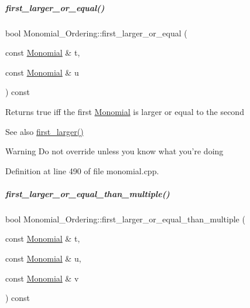 \mbox{\label{group__orderinggroup_afbae8e00a02ce0334bb0376cf0f0db75}} 
\subparagraph{\texorpdfstring{first\+\_\+larger\+\_\+or\+\_\+equal()}{first\_larger\_or\_equal()}}
{\footnotesize\ttfamily bool Monomial\+\_\+\+Ordering\+::first\+\_\+larger\+\_\+or\+\_\+equal (\begin{DoxyParamCaption}\item[{const \hyperlink{group__polygroup_class_monomial}{Monomial} \&}]{t,  }\item[{const \hyperlink{group__polygroup_class_monomial}{Monomial} \&}]{u }\end{DoxyParamCaption}) const}

\begin{DoxyReturn}{Returns}
{\ttfamily true} iff the first \hyperlink{group__polygroup_class_monomial}{Monomial} is larger or equal to the second 
\end{DoxyReturn}
\begin{DoxySeeAlso}{See also}
\hyperlink{group__orderinggroup_aed41fe82e1ca5cd287a93d287fee7c20}{first\+\_\+larger()} 
\end{DoxySeeAlso}
\begin{DoxyWarning}{Warning}
Do not override unless you know what you're doing 
\end{DoxyWarning}


Definition at line 490 of file monomial.\+cpp.

\mbox{\label{group__orderinggroup_ad4af4c79cf46666222fe30fdd4ceb45e}} 
\subparagraph{\texorpdfstring{first\+\_\+larger\+\_\+or\+\_\+equal\+\_\+than\+\_\+multiple()}{first\_larger\_or\_equal\_than\_multiple()}}
{\footnotesize\ttfamily bool Monomial\+\_\+\+Ordering\+::first\+\_\+larger\+\_\+or\+\_\+equal\+\_\+than\+\_\+multiple (\begin{DoxyParamCaption}\item[{const \hyperlink{group__polygroup_class_monomial}{Monomial} \&}]{t,  }\item[{const \hyperlink{group__polygroup_class_monomial}{Monomial} \&}]{u,  }\item[{const \hyperlink{group__polygroup_class_monomial}{Monomial} \&}]{v }\end{DoxyParamCaption}) const}

